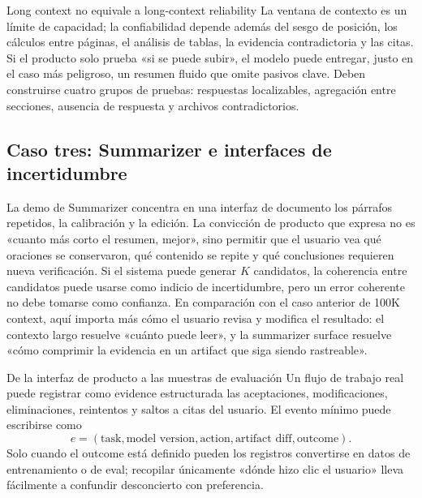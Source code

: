 
\begin{warningbox}{Long context no equivale a long-context reliability}
La ventana de contexto es un límite de capacidad; la confiabilidad depende además del sesgo de posición, los cálculos entre páginas, el análisis de tablas, la evidencia contradictoria y las citas. Si el producto solo prueba «si se puede subir», el modelo puede entregar, justo en el caso más peligroso, un resumen fluido que omite pasivos clave. Deben construirse cuatro grupos de pruebas: respuestas localizables, agregación entre secciones, ausencia de respuesta y archivos contradictorios.
\end{warningbox}

\subsection{Caso tres: Summarizer e interfaces de incertidumbre}

La demo de Summarizer concentra en una interfaz de documento los párrafos repetidos, la calibración y la edición. La convicción de producto que expresa no es «cuanto más corto el resumen, mejor», sino permitir que el usuario vea qué oraciones se conservaron, qué contenido se repite y qué conclusiones requieren nueva verificación. Si el sistema puede generar $K$ candidatos, la coherencia entre candidatos puede usarse como indicio de incertidumbre, pero un error coherente no debe tomarse como confianza. En comparación con el caso anterior de 100K context, aquí importa más cómo el usuario revisa y modifica el resultado: el contexto largo resuelve «cuánto puede leer», y la summarizer surface resuelve «cómo comprimir la evidencia en un artifact que siga siendo rastreable».


\begin{knowledgebox}{De la interfaz de producto a las muestras de evaluación}
Un flujo de trabajo real puede registrar como evidence estructurada las aceptaciones, modificaciones, eliminaciones, reintentos y saltos a citas del usuario. El evento mínimo puede escribirse como
\[
e=(\text{task},\text{model version},\text{action},\text{artifact diff},\text{outcome}).
\]
Solo cuando el outcome está definido pueden los registros convertirse en datos de entrenamiento o de eval; recopilar únicamente «dónde hizo clic el usuario» lleva fácilmente a confundir desconcierto con preferencia.
\end{knowledgebox}

